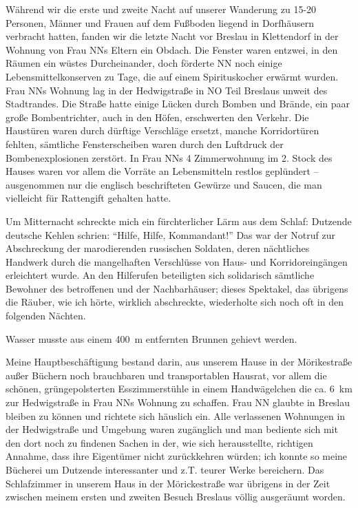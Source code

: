 Während wir die erste und zweite Nacht auf unserer Wanderung zu 15-20 Personen, Männer und Frauen auf dem Fußboden liegend in Dorfhäusern verbracht hatten, fanden wir die letzte Nacht vor Breslau in Klettendorf in der Wohnung von Frau NNs Eltern ein Obdach. Die Fenster waren entzwei, in den Räumen ein wüstes Durcheinander, doch förderte NN noch einige Lebensmittelkonserven zu Tage, die auf einem Spirituskocher erwärmt wurden. Frau NNs Wohnung lag in der Hedwigstraße in NO Teil Breslaus unweit des Stadtrandes. Die Straße hatte einige Lücken durch Bomben und Brände, ein paar große Bombentrichter, auch in den Höfen, erschwerten den Verkehr. Die Haustüren waren durch dürftige Verschläge  ersetzt, manche Korridortüren fehlten, sämtliche Fensterscheiben waren durch den Luftdruck der Bombenexplosionen zerstört. In Frau NNs 4 Zimmerwohnung im 2. Stock des Hauses waren vor allem die Vorräte an Lebensmitteln restlos geplündert -- ausgenommen nur die englisch beschrifteten Gewürze und Saucen, die man vielleicht für Rattengift gehalten hatte.

Um Mitternacht schreckte mich ein fürchterlicher Lärm aus dem Schlaf: Dutzende deutsche Kehlen schrien: \enquote{Hilfe, Hilfe, Kommandant!} Das war der Notruf zur Abschreckung der marodierenden russischen Soldaten, deren nächtliches Handwerk durch die mangelhaften Verschlüsse von Haus- und Korridoreingängen erleichtert wurde. An den Hilferufen beteiligten sich solidarisch sämtliche Bewohner des betroffenen und der Nachbarhäuser; dieses Spektakel, das übrigens die Räuber, wie ich hörte, wirklich abschreckte, wiederholte sich noch oft in den folgenden Nächten.

Wasser musste aus einem 400~m entfernten Brunnen gehievt werden.

 Meine Hauptbeschäftigung bestand darin, aus unserem Hause in der Mörikestraße außer Büchern noch brauchbaren und transportablen Hausrat, vor allem die schönen, grüngepolsterten Esszimmerstühle in einem  Handwägelchen die ca. 6~km zur Hedwigstraße in Frau NNs Wohnung zu schaffen. Frau NN glaubte in Breslau bleiben zu können und richtete sich häuslich ein. Alle verlassenen Wohnungen in der Hedwigstraße und Umgebung waren zugänglich und man bediente sich mit den dort noch zu findenen Sachen in der, wie sich herausstellte, richtigen Annahme, dass ihre Eigentümer nicht zurückkehren würden; ich konnte so meine Bücherei um Dutzende interessanter und z.T. teurer Werke bereichern. Das Schlafzimmer in unserem Haus in der Mörickestraße war übrigens in der Zeit zwischen meinem ersten und zweiten Besuch Breslaus völlig ausgeräumt worden.

